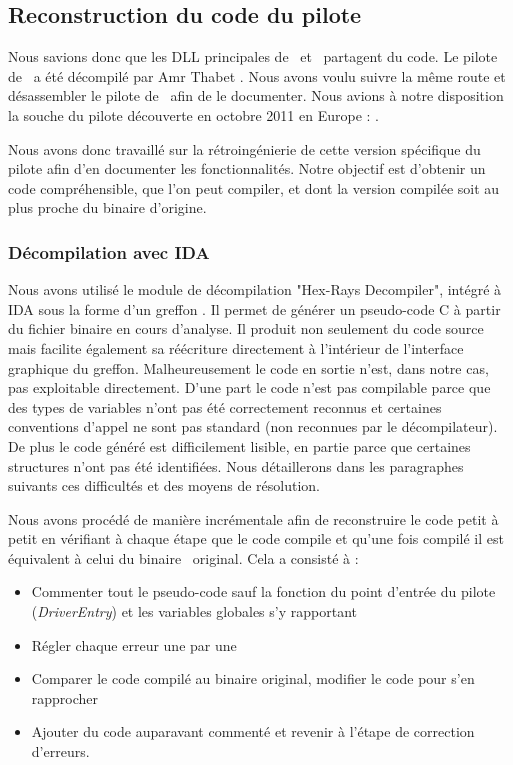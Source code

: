 \subsection{Reconstruction du code du pilote}
Nous savions donc que les DLL principales de \duqu\ et \stux\ partagent du code.
Le pilote de \stux\ a été décompilé par Amr Thabet \cite{ThabetDriver}.
Nous avons voulu suivre la même route et désassembler le pilote de \duqu\ afin de le documenter.
Nous avions à notre disposition la souche du pilote découverte en octobre 2011 en Europe : \driver.

Nous avons donc travaillé sur la rétroingénierie de cette version spécifique du pilote afin d’en documenter les fonctionnalités. 
Notre objectif est d’obtenir un code compréhensible, que l'on peut compiler, et dont la version compilée soit au plus proche du binaire d'origine.

\subsubsection{Décompilation avec IDA}
Nous avons utilisé le module de décompilation "Hex-Rays Decompiler", intégré à IDA sous la forme d’un greffon \cite{IDADecompiler}.
Il permet de générer un pseudo-code C à partir du fichier binaire en cours d’analyse.
Il produit non seulement du code source mais facilite également sa réécriture directement à l’intérieur de l’interface graphique du greffon. 
Malheureusement le code en sortie n’est, dans notre cas, pas exploitable directement. 
D’une part le code n’est pas compilable parce que des types de variables n’ont pas été correctement reconnus et certaines conventions d’appel ne sont pas standard (non reconnues par le décompilateur). 
De plus le code généré est difficilement lisible, en partie parce que certaines structures n’ont pas été identifiées.
Nous détaillerons dans les paragraphes suivants ces difficultés et des moyens de résolution.

Nous avons procédé de manière incrémentale afin de reconstruire le code petit à petit en vérifiant à chaque étape que le code compile et qu'une fois compilé il est équivalent à celui du binaire \driver\ original. 
Cela a consisté à :
\begin{itemize}
 \item Commenter tout le pseudo-code sauf la fonction du point d'entrée du pilote (\emph{DriverEntry}) et les variables globales s'y rapportant
 \item Régler chaque erreur une par une
 \item Comparer le code compilé au binaire original, modifier le code pour s'en rapprocher
 \item Ajouter du code auparavant commenté et revenir à l'étape de correction d'erreurs.
\end{itemize}

